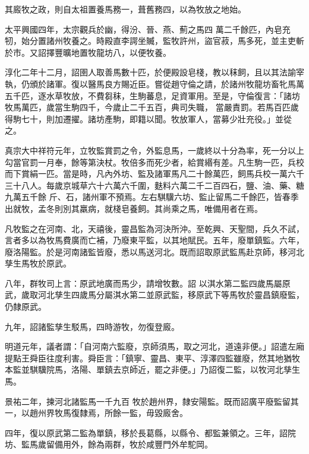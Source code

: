 \begin{pinyinscope}
 其廄牧之政，則自太祖置養馬務一，葺舊務四，以為牧放之地始。



 太平興國四年，太宗觀兵於幽，得汾、晉、燕、薊之馬四
 萬二千餘匹，內皂充牣，始分置諸州牧養之。時殿直李諤坐贓，監牧許州，盜官菽，馬多死，並主吏斬於市。又詔擇豐曠地置牧龍坊八，以便牧養。



 淳化二年十二月，詔圉人取善馬數十匹，於便殿設皂棧，教以秣飼，且以其法諭宰執，仍頒於諸軍。復以醫馬良方賜近臣。嘗從趙守倫之請，於諸州牧龍坊畜牝馬萬五千匹，逐水草牧放，不費芻秣，生駒蕃息，足資軍用。至是，守倫復言：「諸坊牧馬萬匹，歲當生駒四千，今歲止二千五百，典司失職，
 當嚴責罰。若馬百匹歲得駒七十，則加遷擢。諸坊產駒，即籍以聞。牧放軍人，當募少壯充役。」並從之。



 真宗大中祥符元年，立牧監賞罰之令，外監息馬，一歲終以十分為率，死一分以上勾當官罰一月奉，餘等第決杖。牧倍多而死少者，給賞緡有差。凡生駒一匹，兵校而下賞絹一匹。當是時，凡內外坊、監及諸軍馬凡二十餘萬匹，飼馬兵校一萬六千三十八人。每歲京城草六十六萬六千圍，麩料六萬二千二百四石，鹽、油、藥、糖九萬五千餘
 斤、石，諸州軍不預焉。左右騏驥六坊、監止留馬二千餘匹，皆春季出就牧，孟冬則別其羸病，就棧皂養飼。其尚乘之馬，唯備用者在焉。



 凡牧監之在河南、北，天禧後，靈昌監為河決所沖。至乾興、天聖間，兵久不試，言者多以為牧馬費廣而亡補，乃廢東平監，以其地賦民。五年，廢單鎮監。六年，廢洛陽監。於是河南諸監皆廢，悉以馬送河北。既而詔取原武監馬赴京師，移河北孳生馬牧於原武。



 八年，群牧司上言：原武地廣而馬少，請增牧數。詔
 以淇水第二監四歲馬屬原武，歲取河北孳生四歲馬分屬淇水第二並原武監，移原武下等馬牧於靈昌鎮廢監，仍隸原武。



 九年，詔諸監孳生駁馬，四時游牧，勿復登廄。



 明道元年，議者謂：「自河南六監廢，京師須馬，取之河北，道遠非便。」詔遣左廂提點王舜臣往度利害。舜臣言：「鎮寧、靈昌、東平、淳澤四監雖廢，然其地猶牧本監並騏驥院馬，洛陽、單鎮去京師近，罷之非便。」乃詔復二監，以牧河北孳生馬。



 景祐二年，揀河北諸監馬一千九百
 牧於趙州界，隸安陽監。既而詔廣平廢監留其一，以趙州界牧馬復隸焉，所餘一監，毋毀廄舍。



 四年，復以原武第二監為單鎮，移於長葛縣，以縣令、都監兼領之。三年，詔院坊、監馬歲留備用外，餘為兩群，牧於咸豐門外牟駝岡。




\end{pinyinscope}

